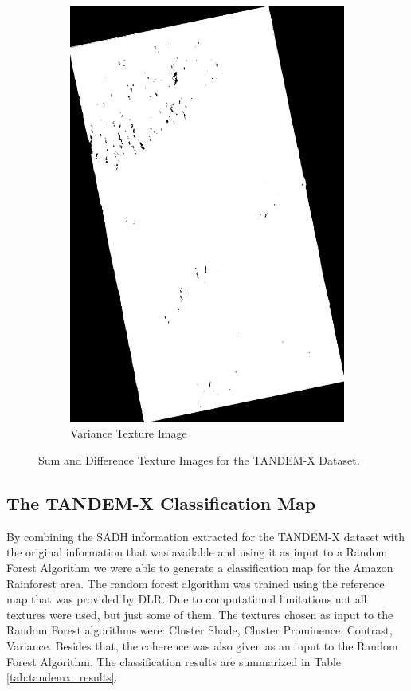   \begin{figure}[H]\ContinuedFloat
    \centering
    \begin{subfigure}[b]{0.4\linewidth}
      \includegraphics[width=\linewidth]{Cap3-Results/sum_and_diff_textures/varianceimage.png}
       \caption{Variance Texture Image}
    \end{subfigure}
    \caption{Sum and Difference Texture Images for the TANDEM-X Dataset.}
    \label{fig:tandemx_textures}
  \end{figure}

\subsection{The TANDEM-X Classification Map}
By combining the SADH information extracted for the TANDEM-X dataset with the original information that was available and using it as input to a Random Forest Algorithm we were able to generate a classification map for the Amazon Rainforest area. The random forest algorithm was trained using the reference map that was provided by DLR. Due to computational limitations not all textures were used, but just some of them. The textures chosen as input to the Random
Forest algorithms were: Cluster Shade, Cluster Prominence, Contrast, Variance. Besides
that, the coherence was also given as an input to the Random Forest Algorithm. The classification results are summarized in Table \ref{tab:tandemx_results}.

